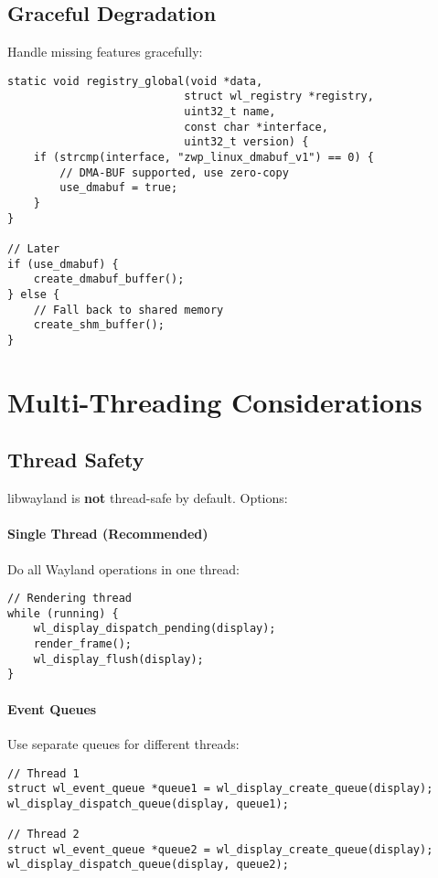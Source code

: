 \subsection{Graceful Degradation}

Handle missing features gracefully:

\begin{lstlisting}[style=cstyle, caption=Feature Detection]
static void registry_global(void *data,
                           struct wl_registry *registry,
                           uint32_t name,
                           const char *interface,
                           uint32_t version) {
    if (strcmp(interface, "zwp_linux_dmabuf_v1") == 0) {
        // DMA-BUF supported, use zero-copy
        use_dmabuf = true;
    }
}

// Later
if (use_dmabuf) {
    create_dmabuf_buffer();
} else {
    // Fall back to shared memory
    create_shm_buffer();
}
\end{lstlisting}

\section{Multi-Threading Considerations}

\subsection{Thread Safety}

libwayland is \textbf{not} thread-safe by default. Options:

\paragraph{Single Thread (Recommended)}
Do all Wayland operations in one thread:
\begin{lstlisting}[style=cstyle]
// Rendering thread
while (running) {
    wl_display_dispatch_pending(display);
    render_frame();
    wl_display_flush(display);
}
\end{lstlisting}

\paragraph{Event Queues}
Use separate queues for different threads:
\begin{lstlisting}[style=cstyle, caption=Per-Thread Queues]
// Thread 1
struct wl_event_queue *queue1 = wl_display_create_queue(display);
wl_display_dispatch_queue(display, queue1);

// Thread 2
struct wl_event_queue *queue2 = wl_display_create_queue(display);
wl_display_dispatch_queue(display, queue2);
\end{lstlisting}

